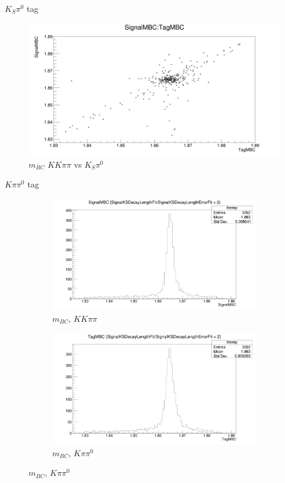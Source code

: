 \documentclass{beamer}
\begin{document}
\begin{frame}{$K_S\pi^0$ tag}
  \begin{figure}
    \centering
    \includegraphics[width=\textwidth]{KSpi0DoubleTag_ScatterPlotMBC.png}
    \caption{$m_{BC}$ $KK\pi\pi$ vs $K_S\pi^0$}
  \end{figure}
\end{frame}

\begin{frame}{$K\pi\pi^0$ tag}
  \begin{figure}
    \centering
    \begin{subfigure}{0.5\textwidth}
      \centering
      \includegraphics[width=\textwidth]{Kpipi0DoubleTag_SignalMBC.png}
      \caption{$m_{BC}$, $KK\pi\pi$}
    \end{subfigure}%
    \begin{subfigure}{0.5\textwidth}
      \centering
      \includegraphics[width=\textwidth]{Kpipi0DoubleTag_TagMBC.png}
      \caption{$m_{BC}$, $K\pi\pi^0$}
    \end{subfigure}
  \end{figure}
\end{frame}
\end{document}
